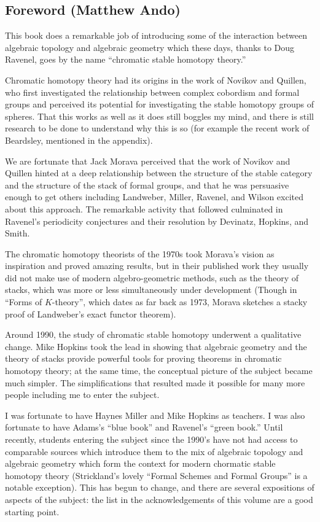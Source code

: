 
\subsection*{Foreword (Matthew Ando)}

This book does a remarkable job of introducing some of the 
interaction between algebraic topology and algebraic geometry which
these days, thanks to Doug Ravenel, goes by the name ``chromatic
stable homotopy theory.''

Chromatic homotopy theory had its origins in the work of Novikov and
Quillen, who first investigated the relationship between complex
cobordism and formal groups and perceived its potential for
investigating the stable homotopy groups of spheres. That this works
as well as it does still boggles my mind, and there is still research
to be done to understand why this is so (for example the recent work
of Beardsley, mentioned in the appendix).  

We are fortunate that Jack Morava perceived that the work of Novikov
and Quillen hinted at a deep relationship between the structure of
the stable category and the structure of the stack of formal groups,
and that he was persuasive enough to get others including Landweber,
Miller, Ravenel, and Wilson excited about this approach. The
remarkable activity that followed culminated in  Ravenel's periodicity
conjectures and their resolution by Devinatz, Hopkins, and Smith. 

The chromatic homotopy theorists of the 1970s took Morava's
vision as inspiration and proved amazing results, but in their
published work they usually did not make use of modern
algebro-geometric methods, such as the theory of stacks, which was
more or less simultaneously under development (Though in
``Forms of $K$-theory'', which dates as far back as 1973, Morava sketches
a stacky proof of Landweber's exact functor theorem).

Around 1990, the study of chromatic stable homotopy underwent a
qualitative change. Mike Hopkins took the lead in
showing that algebraic geometry and the theory of stacks
provide powerful tools for proving theorems in chromatic homotopy
theory; at the same time, the conceptual picture of the subject became
much simpler.  The simplifications that resulted made it possible for
many more people including me to enter the subject. 

I was fortunate to have Haynes Miller and Mike Hopkins as
teachers.  I was also fortunate to have Adams's ``blue book'' and
Ravenel's ``green book.'' Until recently, students entering the
subject since the 1990's have not had access to comparable sources
which introduce them to the mix of algebraic topology and algebraic
geometry which form the context for  
modern chormatic stable homotopy theory (Strickland's 
lovely 
``Formal Schemes and Formal Groups'' is a notable exception).  This has
begun to change, and there are several expositions of aspects of the
subject: the list in the acknowledgements of this volume are a good
starting point.  

